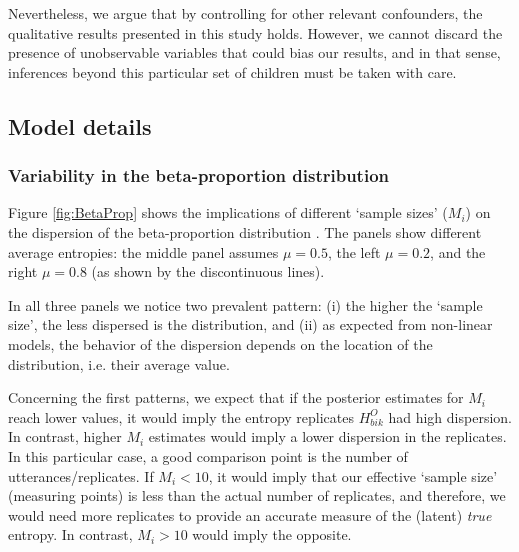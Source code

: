 Nevertheless, we argue that by controlling for other relevant confounders, the qualitative results presented in this study holds. However, we cannot discard the presence of unobservable variables that could bias our results, and in that sense, inferences beyond this particular set of children must be taken with care.
%
%
\subsection{Model details} \label{sSA:model_details}
%
\subsubsection{Variability in the beta-proportion distribution} \label{ssSA:model_variability}
%
Figure \ref{fig:BetaProp} shows the implications of different `sample sizes' ($M_{i}$) on the dispersion of the beta-proportion distribution \cite{Kruschke_2015}. The panels show different average entropies: the middle panel assumes $\mu=0.5$, the left $\mu=0.2$, and the right $\mu=0.8$ (as shown by the discontinuous lines).

In all three panels we notice two prevalent pattern: (i) the higher the `sample size', the less dispersed is the distribution, and (ii) as expected from non-linear models, the behavior of the dispersion depends on the location of the distribution, i.e. their average value.

Concerning the first patterns, we expect that if the posterior estimates for $M_{i}$ reach lower values, it would imply the entropy replicates $H^{O}_{bik}$ had high dispersion. In contrast, higher $M_{i}$ estimates would imply a lower dispersion in the replicates. In this particular case, a good comparison point is the number of utterances/replicates. If $M_{i}<10$, it would imply that our effective `sample size' (measuring points) is less than the actual number of replicates, and therefore, we would need more replicates to provide an accurate measure of the (latent) \textit{true} entropy. In contrast, $M_{i}>10$ would imply the opposite.
%
\begin{comment}
	The value we choose for the prior $\theta$ can be thought of this way: It is the number of new flips of the coin that we would need to make us teeter between the new data and the prior belief about $\mu$. If we would only need a few new flips to sway our beliefs, then our prior beliefs should be represented by a small $\theta$. If we would need a large number of new flips to sway us away from our prior beliefs about $\mu$, then our prior beliefs are worth a very large $\theta$ \cite{Kruschke_2015}.
\end{comment}

